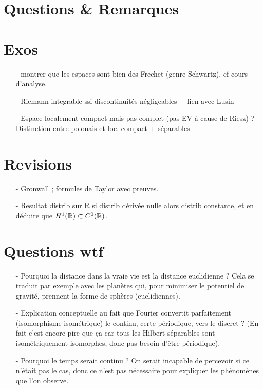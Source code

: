 \documentclass[11pt,a4paper]{article}
\begin{document}



\section{Questions \& Remarques}

\section{Exos}
\begin{itemize}
\item[-] montrer que les espaces sont bien des Frechet (genre Schwartz), cf cours d'analyse.
\item[-] Riemann integrable ssi discontinuités négligeables + lien avec Lusin
\item[-] Espace localement compact mais pas complet (pas EV à cause de Riesz) ? Distinction entre polonais et loc. compact + séparables 
\end{itemize}

\section{Revisions}
\begin{itemize}
\item[-] Gronwall ; formules de Taylor avec preuves.
\item[-] Resultat distrib sur R si distrib dérivée nulle alors distrib constante, et en déduire que $H^1(\mathbb R) \subset C^0(\mathbb R)$.
\end{itemize}

\section{Questions wtf}
\begin{itemize}
\item[-] Pourquoi la distance dans la vraie vie est la distance euclidienne ? Cela se traduit par exemple avec les planètes qui, pour minimiser le potentiel de gravité, prennent la forme de sphères (euclidiennes). \\
\item[-] Explication conceptuelle au fait que Fourier convertit parfaitement (isomorphisme isométrique) le continu, certe périodique, vers le discret ? (En fait c'est encore pire que ça car tous les Hilbert séparables sont isométriquement isomorphes, donc pas besoin d'être périodique).
\item[-] Pourquoi le temps serait continu ? On serait incapable de percevoir si ce n’était pas le cas, donc ce n’est pas nécessaire pour expliquer les phénomènes que l’on observe. 
\end{itemize}
\end{document}
